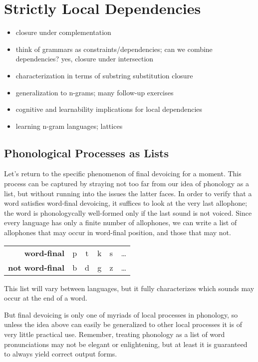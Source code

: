 \chapter{Strictly Local Dependencies}
\label{cha:SL}

\begin{itemize}
    \item closure under complementation
    \item think of grammars as constraints/dependencies; can we combine dependencies? yes, closure under intersection
    \item characterization in terms of substring substitution closure
    \item generalization to n-grams; many follow-up exercises
    \item cognitive and learnability implications for local dependencies
    \item learning n-gram languages; lattices
\end{itemize}

\section{Phonological Processes as Lists}
Let's return to the specific phenomenon of final devoicing for a moment.
This process can be captured by straying not too far from our idea of phonology as a list, but without running into the issues the latter faces.
In order to verify that a word satisfies word-final devoicing, it suffices to look at the very last allophone;
the word is phonologycally well-formed only if the last sound is not voiced.
Since every language has only a finite number of allophones, we can write a list of allophones that may occur in word-final position, and those that may not.
%
\begin{center}
    \begin{tabular}{r@{\hskip 2em}ccccc}
        \textbf{word-final}     & p & t & k & s & \ldots\\
        \textbf{not word-final} & b & d & g & z & \ldots
    \end{tabular}
\end{center}
%
This list will vary between languages, but it fully characterizes which sounds may occur at the end of a word.

But final devoicing is only one of myriads of local processes in phonology, so unless the idea above can easily be generalized to other local processes it is of very little practical use.
Remember, treating phonology as a list of word pronunciations may not be elegant or enlightening, but at least it is guaranteed to always yield correct output forms.

